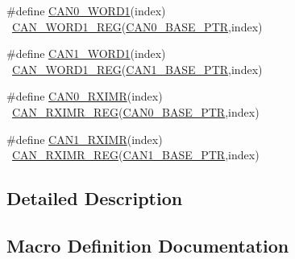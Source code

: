 \begin{DoxyCompactItemize}
\item 
\#define \hyperlink{group___c_a_n___register___accessor___macros_ga4af1bfb5724c2c008255212b870e19f1}{C\+A\+N0\+\_\+\+W\+O\+R\+D1}(index)                                            ~\hyperlink{group___c_a_n___register___accessor___macros_gabea0fd7f957d3c4e7770f1670aff54dc}{C\+A\+N\+\_\+\+W\+O\+R\+D1\+\_\+\+R\+EG}(\hyperlink{group___c_a_n___peripheral_ga1ee8f499e10af9b8e3132e0168e519b9}{C\+A\+N0\+\_\+\+B\+A\+S\+E\+\_\+\+P\+TR},index)
\item 
\#define \hyperlink{group___c_a_n___register___accessor___macros_ga2921c15be0ff05b3a4df90d985c97556}{C\+A\+N1\+\_\+\+W\+O\+R\+D1}(index)                                            ~\hyperlink{group___c_a_n___register___accessor___macros_gabea0fd7f957d3c4e7770f1670aff54dc}{C\+A\+N\+\_\+\+W\+O\+R\+D1\+\_\+\+R\+EG}(\hyperlink{group___c_a_n___peripheral_ga810387eeeb9ccd0e09ae057ff6f0d2ca}{C\+A\+N1\+\_\+\+B\+A\+S\+E\+\_\+\+P\+TR},index)
\item 
\#define \hyperlink{group___c_a_n___register___accessor___macros_ga90e907f58584ed65f8c8cd1ab79e4fc4}{C\+A\+N0\+\_\+\+R\+X\+I\+MR}(index)                                            ~\hyperlink{group___c_a_n___register___accessor___macros_gabcdb674583aff011e9cae0837f6abd5a}{C\+A\+N\+\_\+\+R\+X\+I\+M\+R\+\_\+\+R\+EG}(\hyperlink{group___c_a_n___peripheral_ga1ee8f499e10af9b8e3132e0168e519b9}{C\+A\+N0\+\_\+\+B\+A\+S\+E\+\_\+\+P\+TR},index)
\item 
\#define \hyperlink{group___c_a_n___register___accessor___macros_ga3949267c8d6d6e34cd57e84f1168912c}{C\+A\+N1\+\_\+\+R\+X\+I\+MR}(index)                                            ~\hyperlink{group___c_a_n___register___accessor___macros_gabcdb674583aff011e9cae0837f6abd5a}{C\+A\+N\+\_\+\+R\+X\+I\+M\+R\+\_\+\+R\+EG}(\hyperlink{group___c_a_n___peripheral_ga810387eeeb9ccd0e09ae057ff6f0d2ca}{C\+A\+N1\+\_\+\+B\+A\+S\+E\+\_\+\+P\+TR},index)
\end{DoxyCompactItemize}


\subsection{Detailed Description}


\subsection{Macro Definition Documentation}
